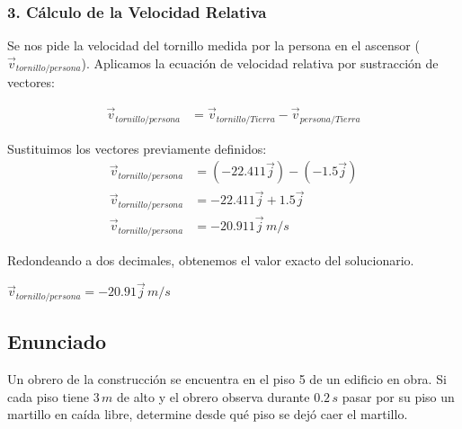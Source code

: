 \documentclass[12pt, a4paper]{article}
\begin{document}
\subsubsection*{3. Cálculo de la Velocidad Relativa}
Se nos pide la velocidad del tornillo medida por la persona en el ascensor ($\vec{v}_{tornillo/persona}$). Aplicamos la ecuación de velocidad relativa por sustracción de vectores:

\begin{align*}
\vec{v}_{tornillo/persona} &= \vec{v}_{tornillo/Tierra} - \vec{v}_{persona/Tierra}
\end{align*}

Sustituimos los vectores previamente definidos:
\begin{align*}
\vec{v}_{tornillo/persona} &= (-22.411\vec{j}) - (-1.5\vec{j}) \\
\vec{v}_{tornillo/persona} &= -22.411\vec{j} + 1.5\vec{j} \\
\vec{v}_{tornillo/persona} &= -20.911\vec{j} \, \si{m/s}
\end{align*}

Redondeando a dos decimales, obtenemos el valor exacto del solucionario.

\begin{tcolorbox}[colback=green!5!white, colframe=green!50!black, title=Respuesta Final]
\centering \Large $\vec{v}_{tornillo/persona} = -20.91\vec{j} \, \si{m/s}$
\end{tcolorbox}

\newpage

\subsection*{Enunciado}
Un obrero de la construcción se encuentra en el piso 5 de un edificio en obra. Si cada piso tiene $3 \, \si{m}$ de alto y el obrero observa durante $0.2 \, \si{s}$ pasar por su piso un martillo en caída libre, determine desde qué piso se dejó caer el martillo.

\begin{center}
\end{center}
\end{document}
